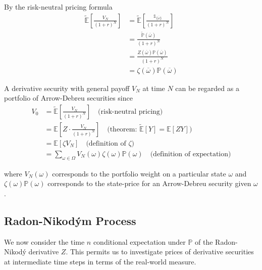 \documentclass[12pt]{article}
\newlength\tindent
\renewcommand{\indent}{\hspace*{\tindent}}
\renewcommand{\P}{\mathbb P}
\newcommand{\E}{\mathbb E}
\begin{document}
By the risk-neutral pricing formula
\begin{align*}
	\tilde{\E} \left[ \frac{V_N}{(1 + r)^N} \right] &= \tilde{\E} \left[ \frac{ \mathds 1_{\{\overline{\omega} \}} }{(1 + r)^N} \right] \\
	&= \frac{ \tilde{\P}(\overline{\omega}) }{ (1 + r)^N } \\
	&= \frac{ Z(\overline{\omega}) \P(\overline{\omega}) }{ (1 + r)^N } \\
	&= \zeta(\overline{\omega}) \P(\overline{\omega})
\end{align*}

\indent A derivative security with general payoff $V_N$ at time $N$ can be regarded as a portfolio of Arrow-Debreu securities since
\begin{align*}
	V_0 &= \tilde{\E} \left[ \frac{V_N}{(1 + r)^N} \right] \quad \text{(risk-neutral pricing)} \\
	&= \E \left[ Z \cdot \frac{V_N}{(1 + r)^N} \right] \quad \text{(theorem: } \tilde{\E}[Y] = \E[ZY]) \\
	&= \E [\zeta V_N] \quad \text{(definition of } \zeta) \\
	&= \sum_{\omega \in \Omega} V_N(\omega)\zeta(\omega)\P(\omega) \quad \text{(definition of expectation)}
\end{align*}

where $V_N(\omega)$ corresponds to the portfolio weight on a particular state $\omega$ and $\zeta(\omega)\P(\omega)$ corresponds to the state-price for an Arrow-Debreu security given $\omega$.

\subsection{Radon-Nikod\'{y}m Process} 

\indent We now consider the time $n$ conditional expectation under $\P$ of the Radon-Nikod\'{y} derivative $Z$. This permits us to investigate prices of derivative securities at intermediate time steps in terms of the real-world measure.
\end{document}
